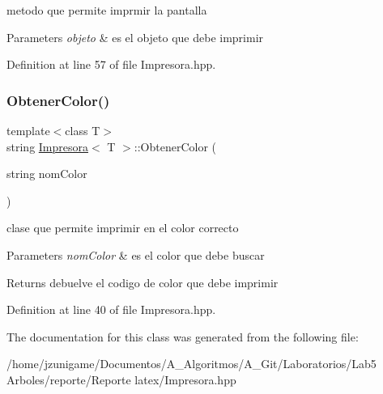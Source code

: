 metodo que permite imprmir la pantalla 


\begin{DoxyParams}{Parameters}
{\em objeto} & es el objeto que debe imprimir \\
\hline
\end{DoxyParams}


Definition at line 57 of file Impresora.\+hpp.

\mbox{\label{class_impresora_abab8709ec339f549ef44dae439b33f12}} 
\subsubsection{\texorpdfstring{Obtener\+Color()}{ObtenerColor()}}
{\footnotesize\ttfamily template$<$class T$>$ \\
string \hyperlink{class_impresora}{Impresora}$<$ T $>$\+::Obtener\+Color (\begin{DoxyParamCaption}\item[{string}]{nom\+Color }\end{DoxyParamCaption})\hspace{0.3cm}{\ttfamily [inline]}}



clase que permite imprimir en el color correcto 


\begin{DoxyParams}{Parameters}
{\em nom\+Color} & es el color que debe buscar \\
\hline
\end{DoxyParams}
\begin{DoxyReturn}{Returns}
debuelve el codigo de color que debe imprimir 
\end{DoxyReturn}


Definition at line 40 of file Impresora.\+hpp.



The documentation for this class was generated from the following file\+:\begin{DoxyCompactItemize}
\item 
/home/jzunigame/\+Documentos/\+A\+\_\+\+Algoritmos/\+A\+\_\+\+Git/\+Laboratorios/\+Lab5 Arboles/reporte/\+Reporte latex/Impresora.\+hpp\end{DoxyCompactItemize}
